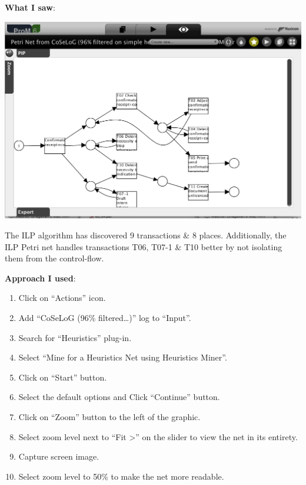 \documentclass[]{article}
\begin{document}
\textbf{What I saw}:

\includegraphics{CoSeLoG_Step_05_Filter96_PetriNet_ILP.png}

The ILP algorithm has discovered 9 transactions \& 8 places.
Additionally, the ILP Petri net handles transactions T06, T07-1 \& T10
better by not isolating them from the control-flow.

\textbf{Approach I used}:

\begin{enumerate}
\def\labelenumi{\arabic{enumi}.}
\setcounter{enumi}{29}
\itemsep1pt\parskip0pt
\item
  Click on ``Actions'' icon.\\
\item
  Add ``CoSeLoG (96\% filtered\ldots{})'' log to ``Input''.\\
\item
  Search for ``Heuristics'' plug-in.\\
\item
  Select ``Mine for a Heuristics Net using Heuristics Miner''.
\item
  Click on ``Start'' button.
\item
  Select the default options and Click ``Continue'' button.
\item
  Click on ``Zoom'' button to the left of the graphic.\\
\item
  Select zoom level next to ``Fit \textgreater{}'' on the slider to view
  the net in its entirety.
\item
  Capture screen image.\\
\item
  Select zoom level to 50\% to make the net more readable.
\end{enumerate}
\end{document}
